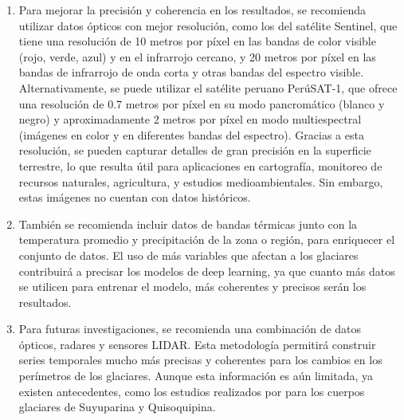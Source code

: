 \begin{enumerate}
	\item Para mejorar la precisión y coherencia en los resultados, se recomienda utilizar datos ópticos con mejor resolución, como los del satélite Sentinel, que tiene una resolución de 10 metros por píxel en las bandas de color visible (rojo, verde, azul) y en el infrarrojo cercano, y 20 metros por píxel en las bandas de infrarrojo de onda corta y otras bandas del espectro visible. Alternativamente, se puede utilizar el satélite peruano PerúSAT-1, que ofrece una resolución de 0.7 metros por píxel en su modo pancromático (blanco y negro) y aproximadamente 2 metros por píxel en modo multiespectral (imágenes en color y en diferentes bandas del espectro). Gracias a esta resolución, se pueden capturar detalles de gran precisión en la superficie terrestre, lo que resulta útil para aplicaciones en cartografía, monitoreo de recursos naturales, agricultura, y estudios medioambientales. Sin embargo, estas imágenes no cuentan con datos históricos.
	\item También se recomienda incluir datos de bandas térmicas junto con la temperatura promedio y precipitación de la zona o región, para enriquecer el conjunto de datos. El uso de más variables que afectan a los glaciares contribuirá a precisar los modelos de deep learning, ya que cuanto más datos se utilicen para entrenar el modelo, más coherentes y precisos serán los resultados.
	\item Para futuras investigaciones, se recomienda una combinación de datos ópticos, radares y sensores LIDAR. Esta metodología permitirá construir series temporales mucho más precisas y coherentes para los cambios en los perímetros de los glaciares. Aunque esta información es aún limitada, ya existen antecedentes, como los estudios realizados por \parencite{montoya2024estimation} para los cuerpos glaciares de Suyuparina y Quisoquipina.
\end{enumerate}
\singlespacing